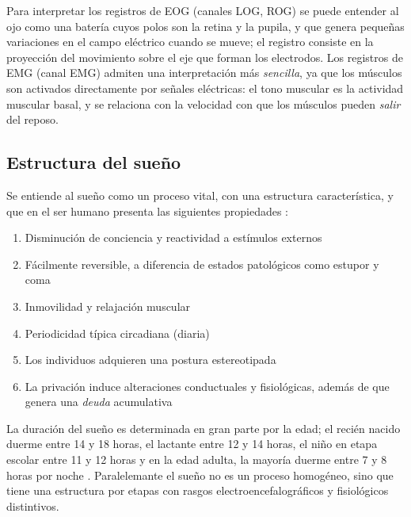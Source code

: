 Para interpretar los registros de EOG (canales LOG, ROG) se puede entender al ojo como una batería
cuyos  polos son la retina y la pupila, y que genera pequeñas variaciones en el campo eléctrico
cuando se mueve; el registro consiste en la proyección del movimiento sobre el eje que forman los
electrodos.
%
Los registros de EMG (canal EMG) admiten una interpretación más \textit{sencilla}, ya que los
músculos son activados directamente por señales eléctricas: el tono muscular es la actividad 
muscular basal, y se relaciona con la velocidad con que los músculos pueden \textit{salir} del 
reposo.



\subsection{Estructura del sueño}

Se entiende al sueño como un proceso vital, con una estructura característica, y que en el ser 
humano presenta las siguientes propiedades \cite{CarrilloMora}:
\begin{enumerate}
\item Disminución de conciencia y reactividad a estímulos externos
\item Fácilmente reversible, a diferencia de estados patológicos como estupor y coma
\item Inmovilidad y relajación muscular
\item Periodicidad típica circadiana (diaria)
\item Los individuos adquieren una postura estereotipada
\item La privación induce alteraciones conductuales y 
fisiológicas, además de que genera una \textit{deuda} acumulativa
\end{enumerate}

La duración del sueño es determinada en gran parte por la edad; el recién nacido duerme entre 14 y 
18 horas, el lactante entre 12 y 14 horas, el niño en etapa escolar entre 11 y 12 horas y en la 
edad adulta, la mayoría duerme entre 7 y 8 horas por noche \cite{Contreras13}.
Paralelemante el sueño no es un proceso homogéneo, sino que tiene una estructura 
por etapas con rasgos electroencefalográficos y fisiológicos distintivos.

